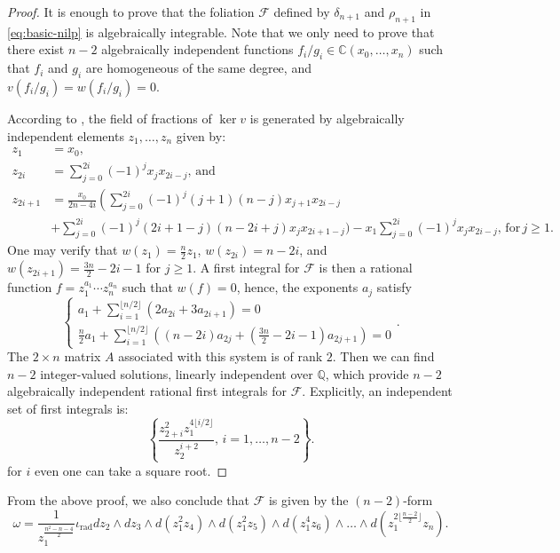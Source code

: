 \documentclass[twoside]{amsart}
\numberwithin{equation}{section}
\DeclareMathOperator{\rad}{rad}
\def\CC{{\mathbb{C}}}
\newcommand{\sF}{\mathscr{F}}
\theoremstyle{definition}
\begin{document}
\begin{proof}
It is enough to prove that the foliation $\sF$ defined by $\delta_{n+1}$ and $\rho_{n+1}$ in \eqref{eq:basic-nilp} is algebraically integrable. Note that we only need to prove that there exist $n-2$ algebraically independent functions $f_i/g_i \in \CC(x_0,\dots, x_n)$ such that $f_i$ and $g_i$ are homogeneous of the same degree, and $v(f_i/g_i)=w(f_i/g_i)=0$.

According to \cite[\S5]{JS}, the field of fractions of $\ker v$ is generated by algebraically independent elements $z_1, \dots, z_n$ given by: 
\begin{align*}
    z_1 & = x_0, \\
    z_{2i} & = \sum_{j=0}^{2i} (-1)^j x_jx_{2i-j}, \, \text{and} \\
    z_{2i+1} & = \frac{x_0}{2n-4i}\left(\sum_{j=0}^{2i}(-1)^j (j+1)(n-j)x_{j+1}x_{2i-j} \right. \\ &  +\sum_{j=0}^{2i}(-1)^j (2i+1-j)(n-2i+j)x_jx_{2i+1-j}\Bigg) - x_1\sum_{j=0}^{2i}(-1)^jx_jx_{2i-j}, \, \text{for} \, j\geq 1.
\end{align*}
One may verify that $w(z_1) = \frac{n}{2}z_1$, $w(z_{2i}) = n-2i$, and $w(z_{2i+1}) = \frac{3n}{2}-2i-1$ for $j\geq 1$. A first integral for $\sF$ is then a rational function $f = z_1^{a_1}\cdots z_n^{a_n}$ such that $w(f) = 0$, hence, the exponents $a_j$ satisfy
\[
\begin{cases}
    \displaystyle a_1 + \sum_{i = 1}^{\lfloor n/2 \rfloor} (2a_{2i}+3a_{2i+1}) = 0 \\
    \displaystyle \frac{n}{2}a_1 + \sum_{i = 1}^{\lfloor n/2 \rfloor} \left( (n-2i)a_{2j}+ \left(\frac{3n}{2}-2i-1 \right)a_{2j+1}\right) = 0
\end{cases}.
\]
The $2\times n$ matrix $A$ associated with this system is of rank $2$. Then we can find $n-2$ integer-valued solutions, linearly independent over $\mathbb{Q}$, which provide $n-2$ algebraically independent rational first integrals for $\sF$. Explicitly, an independent set of first integrals is:
\[
\left\{ \frac{z_{2+i}^2z_1^{4\lfloor i/2 \rfloor}}{z_2^{i+2}}, \, i = 1, \dots , n-2  \right\}.
\]
for $i$ even one can take a square root.
\end{proof}

From the above proof, we also conclude that $\sF$ is given by the $(n-2)$-form
\[
\omega = \frac{1}{z_1^{\frac{n^2- n-4}{2}}}\iota_{\rad} dz_2 \wedge dz_3 \wedge d(z_1^{2}z_{4}) \wedge d(z_1^{2}z_{5}) \wedge d(z_1^{4}z_{6}) \wedge \dots \wedge d(z_1^{2\lfloor \frac{n-2}{2} \rfloor}z_{n}).
\]
\end{document}

